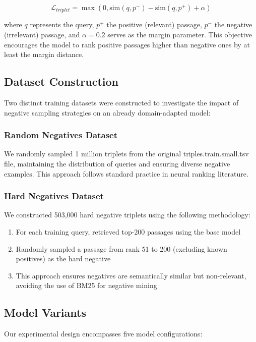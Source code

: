 \documentclass[conference]{IEEEtran}
\begin{document}
\begin{equation}
\mathcal{L}_{triplet} = \max(0, \text{sim}(q,p^-) - \text{sim}(q,p^+) + \alpha)
\end{equation}

where $q$ represents the query, $p^+$ the positive (relevant) passage, $p^-$ the negative (irrelevant) passage, and $\alpha=0.2$ serves as the margin parameter. This objective encourages the model to rank positive passages higher than negative ones by at least the margin distance.

\subsection{Dataset Construction}
Two distinct training datasets were constructed to investigate the impact of negative sampling strategies on an already domain-adapted model:

\subsubsection{Random Negatives Dataset}
We randomly sampled 1 million triplets from the original triples.train.small.tsv file, maintaining the distribution of queries and ensuring diverse negative examples. This approach follows standard practice in neural ranking literature.

\subsubsection{Hard Negatives Dataset}
We constructed 503,000 hard negative triplets using the following methodology:
\begin{enumerate}
\item For each training query, retrieved top-200 passages using the base model
\item Randomly sampled a passage from rank 51 to 200 (excluding known positives) as the hard negative
\item This approach ensures negatives are semantically similar but non-relevant, avoiding the use of BM25 \cite{robertson2009probabilistic} for negative mining
\end{enumerate}

\subsection{Model Variants}
Our experimental design encompasses five model configurations:
\end{document}
